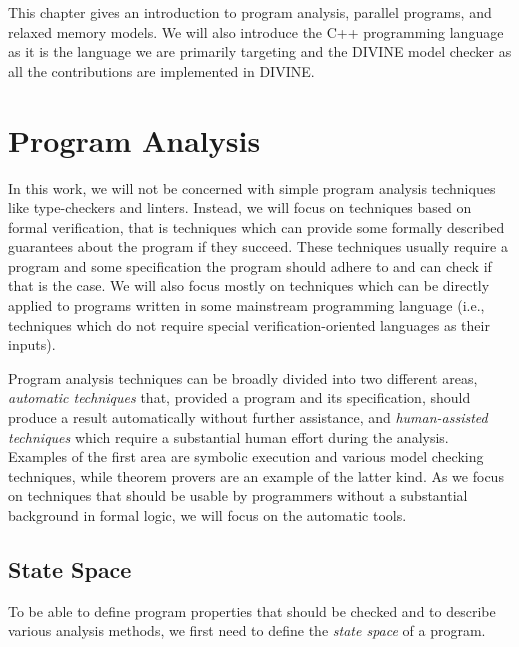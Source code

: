This chapter gives an introduction to program analysis, parallel programs, and relaxed memory models.
We will also introduce the C++ programming language as it is the language we are primarily targeting and the DIVINE model checker as all the contributions are implemented in DIVINE.

\section{Program Analysis} %

In this work, we will not be concerned with simple program analysis techniques like type-checkers and linters.
Instead, we will focus on techniques based on formal verification, that is techniques which can provide some formally described guarantees about the program if they succeed.
These techniques usually require a program and some specification the program should adhere to and can check if that is the case.
We will also focus mostly on techniques which can be directly applied to programs written in some mainstream programming language (i.e., techniques which do not require special verification-oriented languages as their inputs).

Program analysis techniques can be broadly divided into two different areas, \emph{automatic techniques} that, provided a program and its specification, should produce a result automatically without further assistance, and \emph{human-assisted techniques} which require a substantial human effort during the analysis.
Examples of the first area are symbolic execution and various model checking techniques, while theorem provers are an example of the latter kind.
As we focus on techniques that should be usable by programmers without a substantial background in formal logic, we will focus on the automatic tools.


\subsection{State Space}

To be able to define program properties that should be checked and to describe various analysis methods, we first need to define the \emph{state space} of a program.

